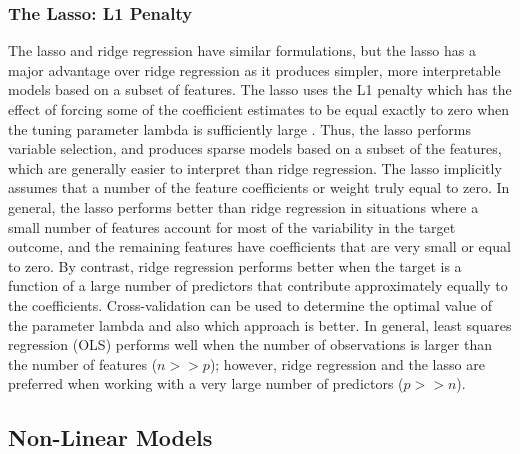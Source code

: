 \documentclass[sigconf]{acmart}
\begin{document}

\subsubsection{The Lasso: L1 Penalty} 

The lasso and ridge regression have similar formulations, but the lasso has 
a major advantage over ridge regression as it produces simpler, more 
interpretable models based on a subset of features. The lasso uses the L1 
penalty which has the effect of forcing some of the coefficient estimates to be
equal exactly to zero when the tuning parameter lambda is sufficiently large 
\cite{statlearn13}. Thus, the lasso performs variable selection, and produces 
sparse models based on a subset of the features, which are generally easier to 
interpret than ridge regression. The lasso implicitly assumes that a number of 
the feature coefficients or weight truly equal to zero. In general, the lasso 
performs better than ridge regression in situations where a small number of 
features account for most of the variability in the target outcome, and the 
remaining features have coefficients that are very small or equal to zero. 
By contrast, ridge regression performs better when the target is a function 
of a large number of predictors that contribute approximately equally to the
coefficients. Cross-validation can be used to determine the optimal value
of the parameter lambda and also which approach is better. In general, least 
squares regression (OLS) performs well when the number of observations is 
larger than the number of features ($\textit{n}>>\textit{p}$); however, ridge 
regression and the lasso are preferred when working with a very large number 
of predictors ($\textit{p}>>\textit{n}$).


\subsection{Non-Linear Models}
\end{document}
